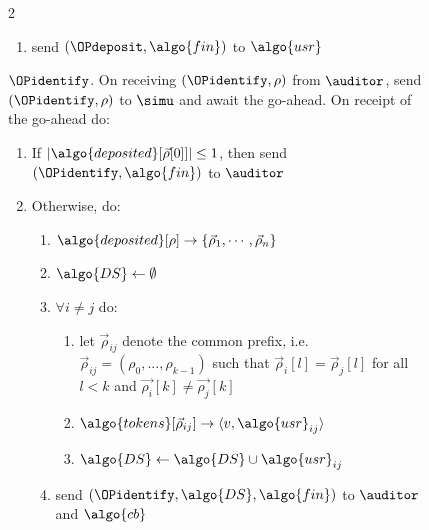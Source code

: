 \begin{figure}
\begin{minipage}{1.1\textwidth}
\begin{framed}
\begin{multicols}{2}
\begin{enumerate}
\begin{enumerate}
\begin{enumerate}
                \item send $(\OPdeposit, \algo{fin})$ to $\algo{usr}$

              \end{enumerate}

          \end{enumerate}

      \end{enumerate}

      {$\OPidentify$.} On receiving $(\OPidentify, \rho)$ from $\auditor$,
      send $(\OPidentify, \rho)$ to $\simu$ and await the go-ahead. On receipt
      of the go-ahead do:

      \begin{enumerate}

        \item If $|\algo{deposited}[\vec{\rho}[0]]| \leq 1$, then send
          $(\OPidentify, \algo{fin})$ to $\auditor$

        \item Otherwise, do:

          \begin{enumerate}

            \item $\algo{deposited}[\rho] \rightarrow \{\vec{\rho}_1, \cdots,
              \vec{\rho}_n\}$

            \item $\algo{DS} \leftarrow \emptyset$

            \item $\forall i\neq j $ do:

              \begin{enumerate}

                \item let $\vec{\rho}_{ij}$ denote the common prefix, i.e.\
                  $\vec{\rho}_{ij} = (\rho_0, ..., \rho_{k-1})$ such that
                  $\vec{\rho}_i[l] = \vec{\rho}_j[l]$ for all $l < k$ and
                  $\vec{\rho_i}[k] \neq \vec{\rho_j}[k]$

                \item $\algo{tokens}[\vec{\rho}_{ij}] \rightarrow \langle v,
                  \algo{usr}_{ij}\rangle$ \item $\algo{DS} \gets \algo{DS} \cup
                  \algo{usr}_{ij}$

              \end{enumerate}

            \item send $(\OPidentify, \algo{DS}, \algo{fin})$ to $\auditor$
              and $\algo{cb}$


\end{enumerate}
\end{enumerate}
\end{multicols}
\end{framed}
\end{minipage}
\end{figure}
